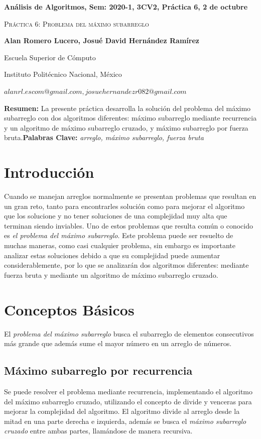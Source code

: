 \documentclass[12pt,twoside]{article}
\date{}
\begin{document}
\centerline{\bf An\'alisis de Algoritmos, Sem: 2020-1, 3CV2, Pr\'actica 6, 2 de octubre}
\centerline{}
\centerline{}
\begin{center}
\Large{\textsc{Pr\'actica 6: Problema del m\'aximo subarreglo}}
\end{center}
\centerline{\bf{Alan Romero Lucero, Josu\'e David Hern\'andez Ram\'irez}}
\centerline{}
\centerline{Escuela Superior de C\'omputo}
\centerline{Instituto Polit\'ecnico Nacional, M\'exico}
\centerline{$alanrl.escom@gmail.com, josuehernandezr082@gmail.com$}
\newtheorem{Theorem}{\quad Theorem}[section]
\newtheorem{Definition}[Theorem]{\quad Definition}
\newtheorem{Corollary}[Theorem]{\quad Corollary}
\newtheorem{Lemma}[Theorem]{\quad Lemma}
\newtheorem{Example}[Theorem]{\quad Example}
\bigskip
\textbf{Resumen:} La presente pr\'actica desarrolla la soluci\'on del problema del m\'aximo subarreglo con dos algoritmos diferentes: m\'aximo subarreglo mediante recurrencia y un algoritmo de m\'aximo subarreglo cruzado, y m\'aximo subarreglo por fuerza bruta.{\bf Palabras Clave:} {\textit{arreglo, m\'aximo subarreglo, fuerza bruta}}
\section{Introducci\'on}
Cuando se manejan arreglos normalmente se presentan problemas que resultan en un gran reto, tanto para encontrarles soluci\'on como para mejorar el algoritmo que los solucione y no tener soluciones de una complejidad muy alta que terminan siendo inviables. Uno de estos problemas que resulta com\'un o conocido es \textit{el problema del m\'aximo subarreglo}. Este problema puede ser resuelto de muchas maneras, como casi cualquier problema, sin embargo es importante analizar estas soluciones debido a que su complejidad puede aumentar considerablemente, por lo que se analizar\'an dos algoritmos diferentes: mediante fuerza bruta y mediante un algoritmo de m\'aximo subarreglo cruzado.
\section{Conceptos B\'asicos}
El \textit{problema del m\'aximo subarreglo} busca el subarreglo de elementos consecutivos m\'as grande que adem\'as sume el mayor n\'umero en un arreglo de n\'umeros.
\subsection{M\'aximo subarreglo por recurrencia}
Se puede resolver el problema mediante recurrencia, implementando el algoritmo del m\'aximo subarreglo cruzado, utilizando el concepto de divide y venceras para mejorar la complejidad del algoritmo. El algoritmo divide al arreglo desde la mitad en una parte derecha e izquierda, adem\'as se busca el \textit{m\'aximo subarreglo cruzado} entre ambas partes, llam\'andose de manera recursiva.
\end{document}
